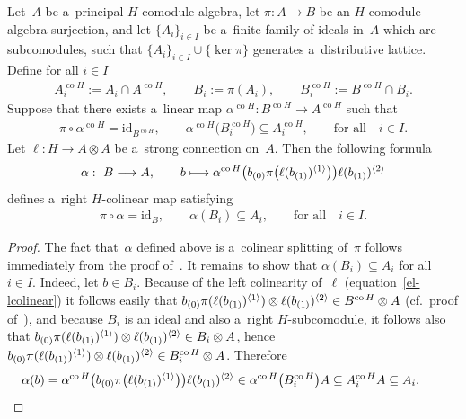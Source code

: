 \documentclass[pdftex]{sigma}
\DeclareMathOperator{\co}{co}
\def\sw#1{{\sb{(#1)}}}
\newcommand{\ls}[1]{\ell(#1)^{\langle 1\rangle}}
\newcommand{\rs}[1]{\ell(#1)^{\langle 2\rangle}}
\begin{document}
\begin{lemma}
\label{alphaexists}
Let~$A$ be a~principal $H$-comodule algebra, let $\pi:A\rightarrow B$ be an $H$-comodule algebra surjection, and let
$\{A_i\}_{i\in I}$ be a~finite family of ideals in~$A$ which are subcomodules, such that $\{A_i\}_{i\in
I}\cup\{\ker\pi\}$ generates a~distributive lattice.
Define for all $i\in I$
\begin{gather*}
A_i^{\co H}:=A_i\cap A^{\co H},
\qquad
B_i:=\pi(A_i),
\qquad
B_i^{\co H}:=B^{\co H}\cap B_i.
\end{gather*}
Suppose that there exists a~linear map $\alpha^{\co H}:B^{\co H}\rightarrow A^{\co H}$ such that
\begin{gather*}
\pi\circ\alpha^{\co H}=\mathrm{id}_{B^{\co H}},
\qquad
\alpha^{\co H}\big(B^{\co H}_i\big)\subseteq A_i^{\co H},
\qquad
\text{for all}
\quad
i\in I.
\end{gather*}
Let $\ell:H\rightarrow A\otimes A$ be a~strong connection on~$A$.
Then the following formula
\begin{gather*}
\alpha: \ B\longrightarrow A,
\qquad
b\longmapsto \alpha^{\co H}\big(b\sw{0}\pi\big(\ls{b\sw{1}}\big)\big)\rs{b\sw{1}}
\end{gather*}
defines a~right $H$-colinear map satisfying
\begin{gather*}
\pi\circ\alpha=\mathrm{id}_{B},
\qquad
\alpha(B_i)\subseteq A_i,
\qquad
\text{for all}
\quad
i\in I.
\end{gather*}
\end{lemma}
\begin{proof}
The fact that~$\alpha$ def\/ined above is a~colinear splitting of~$\pi$ follows immediately from the proof of~\cite[Lemma~3.1]{hkmz11}.
It remains to show that $\alpha(B_i)\subseteq A_i$ for all $i\in I$.
Indeed, let $b\in B_i$.
Because of the left colinearity of~$\ell$ (equation~\eqref{el-lcolinear}) it follows easily that
$b\sw{0}\pi(\ls{b\sw{1}})\otimes\rs{b\sw{1}}\in B^{\co H}\otimes A$ (cf.\
proof of~\cite[Lemma~3.1]{hkmz11}), and because $B_i$ is an ideal and also a~right $H$-subcomodule, it follows also that
$b\sw{0}\pi(\ls{b\sw{1}})\otimes\rs{b\sw{1}}\in B_i\otimes A$, hence $b\sw{0}\pi(\ls{b\sw{1}})\otimes\rs{b\sw{1}}\in B^{\co H}_i\otimes A$.
Therefore
\begin{gather*}
\alpha(b)=\alpha^{\co H}\big(b\sw{0}\pi\big(\ls{b\sw{1}}\big)\big)\rs{b\sw{1}} \in \alpha^{\co H}\big(B_i^{\co
H}\big)A\subseteq A^{\co H}_iA\subseteq A_i.\tag*{\qed}
\end{gather*}
\renewcommand{\qed}{}
\end{proof}
\end{document}
